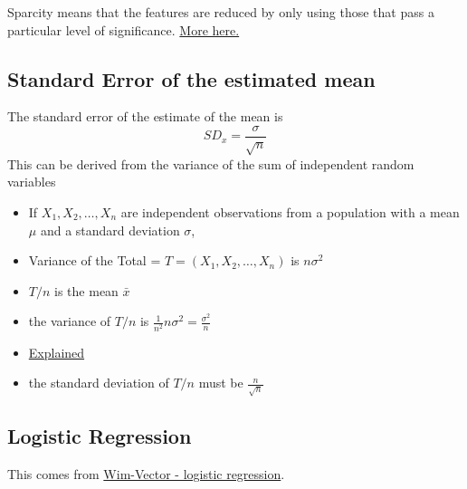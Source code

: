 \documentclass[12pt, a4paper, oneside]{article}\usepackage[]{graphicx}\usepackage[]{color}
\begin{document}
Sparcity means that the features are reduced by only using those that pass a particular level of significance.  \href{http://statweb.stanford.edu/~tibs/lasso.html}{More here.}

\subsection{Standard Error of the estimated mean}
The standard error of the estimate of the mean is 
\begin{equation}
SD_x = \frac{\sigma}{\sqrt{n}}
\end{equation}
This can be derived from the variance of the sum of independent random variables
\begin{itemize}
\item If $X_1, X_2, \dots, X_n$ are independent observations from a population with a mean $\mu$ and a standard deviation $\sigma$, 
\item Variance of the Total = $T = (X_1, X_2, \dots, X_n)$ is $n\sigma^2$
\item $T/n$ is the mean $\bar{x}$
\item the variance of $T/n$ is $\frac{1}{n^2}n\sigma^2 = \frac{\sigma^2}{n}$
\item \href{https://onlinecourses.science.psu.edu/stat414/node/167}{Explained}
\item the standard deviation of $T/n$ must be $\frac{n}{\sqrt{n}}$
\end{itemize}

\subsection{Logistic Regression}
This comes from \href{http://www.win-vector.com/blog/2010/11/learn-a-powerful-machine-learning-tool-logistic-regression-and-beyond/}{Wim-Vector - logistic regression}.  
\end{document}
